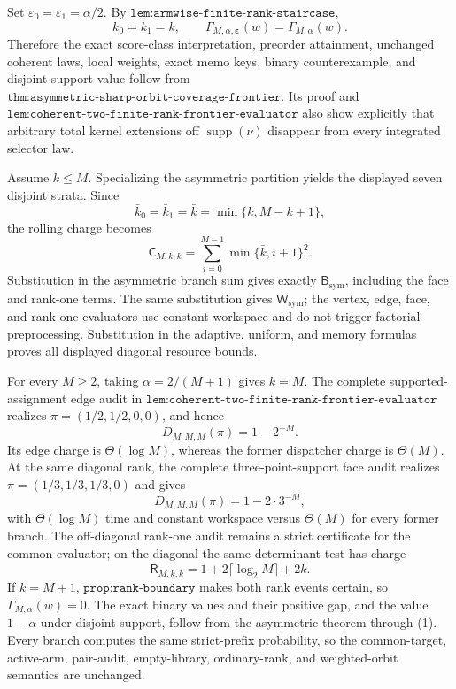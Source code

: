 Set \(\varepsilon_0=\varepsilon_1=\alpha/2\). By \(\texttt{lem:armwise-finite-rank-staircase}\),
\[
k_0=k_1=k,\qquad
\Gamma_{M,\alpha,\boldsymbol\varepsilon}(w)=\Gamma_{M,\alpha}(w).
\tag{1}
\]
Therefore the exact score-class interpretation, preorder attainment, unchanged coherent laws, local weights, exact memo keys, binary counterexample, and disjoint-support value follow from \(\texttt{thm:asymmetric-sharp-orbit-coverage-frontier}\). Its proof and \(\texttt{lem:coherent-two-finite-rank-frontier-evaluator}\) also show explicitly that arbitrary total kernel extensions off \(\operatorname{supp}(\nu)\) disappear from every integrated selector law.

Assume \(k\le M\). Specializing the asymmetric partition yields the displayed seven disjoint strata. Since
\[
\bar k_0=\bar k_1=\bar k=\min\{k,M-k+1\},
\]
the rolling charge becomes
\[
\mathsf C_{M,k,k}=\sum_{i=0}^{M-1}\min\{\bar k,i+1\}^2.
\]
Substitution in the asymmetric branch sum gives exactly \(\mathsf B_{\mathrm{sym}}\), including the face and rank-one terms. The same substitution gives \(\mathsf W_{\mathrm{sym}}\); the vertex, edge, face, and rank-one evaluators use constant workspace and do not trigger factorial preprocessing. Substitution in the adaptive, uniform, and memory formulas proves all displayed diagonal resource bounds.

For every \(M\ge2\), taking \(\alpha=2/(M+1)\) gives \(k=M\). The complete supported-assignment edge audit in \(\texttt{lem:coherent-two-finite-rank-frontier-evaluator}\) realizes \(\pi=(1/2,1/2,0,0)\), and hence
\[
D_{M,M,M}(\pi)=1-2^{-M}.
\]
Its edge charge is \(\Theta(\log M)\), whereas the former dispatcher charge is \(\Theta(M)\). At the same diagonal rank, the complete three-point-support face audit realizes \(\pi=(1/3,1/3,1/3,0)\) and gives
\[
D_{M,M,M}(\pi)=1-2\cdot3^{-M},
\]
with \(\Theta(\log M)\) time and constant workspace versus \(\Theta(M)\) for every former branch. The off-diagonal rank-one audit remains a strict certificate for the common evaluator; on the diagonal the same determinant test has charge
\[
\mathsf R_{M,k,k}=1+2\lceil\log_2M\rceil+2\bar k.
\]
If \(k=M+1\), \(\texttt{prop:rank-boundary}\) makes both rank events certain, so \(\Gamma_{M,\alpha}(w)=0\). The exact binary values and their positive gap, and the value \(1-\alpha\) under disjoint support, follow from the asymmetric theorem through (1). Every branch computes the same strict-prefix probability, so the common-target, active-arm, pair-audit, empty-library, ordinary-rank, and weighted-orbit semantics are unchanged.